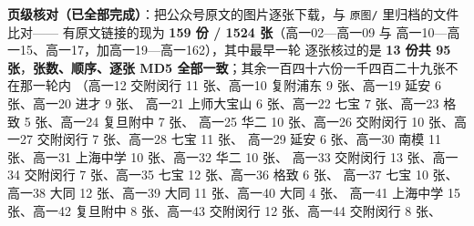 \documentclass[a4paper,11pt]{article}
\begin{document}
\textbf{页级核对（已全部完成）}：把公众号原文的图片逐张下载，与 \texttt{原图/\allowbreak{}} 里归档的文件比对------
有原文链接的现为 \textbf{159 份 / 1524 张}（高一02---高一09 与 高一10---高一15、高一17，加高一19---高一162），其中最早一轮
逐张核过的是 \textbf{13 份共 95 张}，\textbf{张数、顺序、逐张 MD5 全部一致}；其余一百四十六份一千四百二十九张不在那一轮内
（高一12 交附闵行 11 张、高一10 复附浦东 9 张、高一19 延安 6 张、高一20 进才 9 张、
高一21 上师大宝山 6 张、高一22 七宝 7 张、高一23 格致 5 张、高一24 复旦附中 7 张、
高一25 华二 10 张、高一26 交附闵行 10 张、高一27 交附闵行 7 张、高一28 七宝 11 张、
高一29 延安 6 张、高一30 南模 11 张、高一31 上海中学 10 张、高一32 华二 10 张、
高一33 交附闵行 13 张、高一34 交附闵行 7 张、高一35 七宝 12 张、高一36 格致 6 张、
高一37 七宝 10 张、高一38 大同 12 张、高一39 大同 11 张、高一40 大同 4 张、
高一41 上海中学 15 张、高一42 复旦附中 8 张、高一43 交附闵行 12 张、高一44 交附闵行 8 张、
\end{document}
